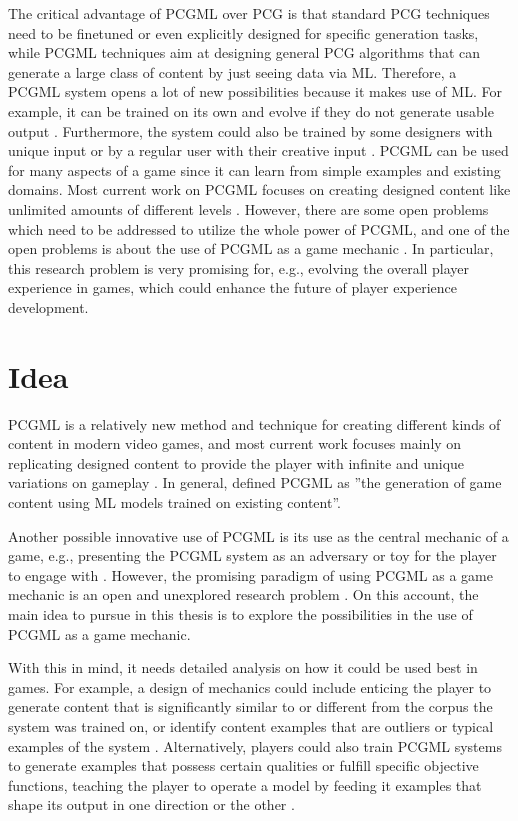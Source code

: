 \documentclass[MGS,Master,english]{twbook}%
\begin{document}
The critical advantage of PCGML over PCG is that standard PCG techniques need to be finetuned or even explicitly designed for specific generation tasks, while PCGML techniques aim at designing general PCG algorithms that can generate a large class of content by just seeing data via ML. Therefore, a \ac{PCGML} system opens a lot of new possibilities because it makes use of ML. For example, it can be trained on its own and evolve if they do not generate usable output \cite{pcgml::paper}. Furthermore, the system could also be trained by some designers with unique input or by a regular user with their creative input \cite{pcgml::paper}. \ac{PCGML} can be used for many aspects of a game since it can learn from simple examples and existing domains. Most current work on PCGML focuses on creating designed content like unlimited amounts of different levels \cite{pcgml::paper}. However, there are some open problems which need to be addressed to utilize the whole power of PCGML, and one of the open problems is about the use of PCGML as a game mechanic \cite{pcgml::paper}. In particular, this research problem is very promising for, e.g., evolving the overall player experience in games, which could enhance the future of player experience development.

\section{Idea}
\ac{PCGML} is a relatively new method and technique for creating different kinds of content in modern video games, and most current work focuses mainly on replicating designed content to provide the player with infinite and unique variations on gameplay \cite{pcgml::paper}. In general, \citep[p. 1]{pcgml::paper} defined PCGML as ''the generation of game content using ML models trained on existing content''. 

Another possible innovative use of PCGML is its use as the central mechanic of a game, e.g., presenting the PCGML system as an adversary or toy for the player to engage with  \cite{pcgml::paper}. However, the promising paradigm of using PCGML as a game mechanic is an open and unexplored research problem \cite{pcgml::paper}. On this account, the main idea to pursue in this thesis is to explore the possibilities in the use of PCGML as a game mechanic.

With this in mind, it needs detailed analysis on how it could be used best in games. For example, a design of mechanics could include enticing the player to generate content that is significantly similar to or different from the corpus the system was trained on, or identify content examples that are outliers or typical examples of the system \cite{pcgml::paper}. Alternatively, players could also train \ac{PCGML} systems to generate examples that possess certain qualities or fulfill specific objective functions, teaching the player to operate a model by feeding it examples that shape its output in one direction or the other \cite{pcgml::paper}.
\end{document}
